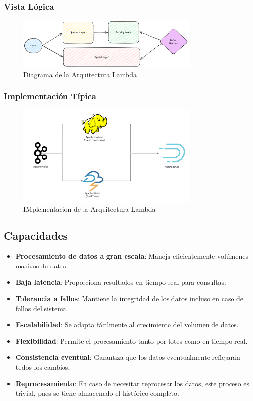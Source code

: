 \newpage
\subsubsection{Vista Lógica}
\begin{figure}[h]
\centering
\includegraphics[width=0.8\textwidth]{teorico/lambda.png}
\caption{Diagrama de la Arquitectura Lambda}
\label{fig:arquitectura_lambda}
\end{figure}

\subsubsection{Implementación Típica}
\begin{figure}[h]
\centering
\includegraphics[width=0.8\textwidth]{teorico/LambdaImplement.png}
\caption{IMplementacion de la Arquitectura Lambda}
\label{fig:implementation_arquitectura_lambda}
\end{figure}

\clearpage
\newpage

\subsection{Capacidades}
\begin{itemize}
\item \textbf{Procesamiento de datos a gran escala}: Maneja eficientemente volúmenes masivos de datos.
\item \textbf{Baja latencia}: Proporciona resultados en tiempo real para consultas.
\item \textbf{Tolerancia a fallos}: Mantiene la integridad de los datos incluso en caso de fallos del sistema.
\item \textbf{Escalabilidad}: Se adapta fácilmente al crecimiento del volumen de datos.
\item \textbf{Flexibilidad}: Permite el procesamiento tanto por lotes como en tiempo real.
\item \textbf{Consistencia eventual}: Garantiza que los datos eventualmente reflejarán todos los cambios.
\item \textbf{Reprocesamiento}: En caso de necesitar reprocesar los datos, este proceso es trivial, pues se tiene almacenado el histórico completo.
\end{itemize}

